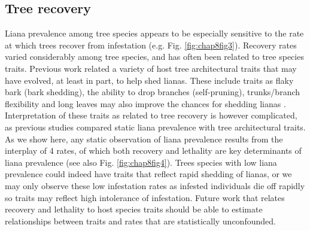 \documentclass[b5paper,justified]{tufte-book} %
\begin{document}
\begin{fullwidth}
\subsection{Tree recovery} 
Liana prevalence among tree species appears to be especially sensitive to the rate at which trees recover from infestation (e.g. Fig. \ref{fig:chap8fig3}). Recovery rates varied considerably among tree species, and has often been related to tree species traits. Previous work related a variety of host tree architectural traits that may have evolved, at least in part, to help shed lianas. These include traits as flaky bark (bark shedding), the ability to drop branches (self-pruning), trunks/branch flexibility and long leaves may also improve the chances for shedding lianas \citep{Putz1984, Heijden2008}. Interpretation of these traits as related to tree recovery is however complicated, as previous studies compared static liana prevalence with tree architectural traits. As we show here, any static observation of liana prevalence results from the interplay of 4 rates, of which both recovery and lethality are key determinants of liana prevalence (see also Fig. \ref{fig:chap8fig4}). Trees species with low liana prevalence could indeed have traits that reflect rapid shedding of lianas, or we may only observe these low infestation rates as infested individuals die off rapidly so traits may reflect high intolerance of infestation. Future work that relates recovery and lethality to host species traits should be able to estimate relationships between traits and rates that are statistically unconfounded. 


\end{fullwidth}
\end{document}
